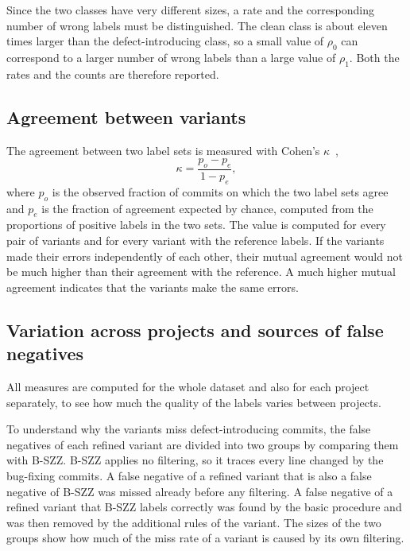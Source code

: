 \documentclass[12pt,a4paper,oneside]{report}
\newcommand{\rhoz}{\rho_0}
\newcommand{\rhoo}{\rho_1}
\begin{document}
Since the two classes have very different sizes, a rate and the corresponding
number of wrong labels must be distinguished. The clean class is about eleven
times larger than the defect-introducing class, so a small value of $\rhoz$
can correspond to a larger number of wrong labels than a large value of
$\rhoo$. Both the rates and the counts are therefore reported.

\subsection{Agreement between variants}

The agreement between two label sets is measured with Cohen's
$\kappa$~\cite{cohen1960kappa},
\begin{equation}
\kappa = \frac{p_o - p_e}{1 - p_e},
\end{equation}
where $p_o$ is the observed fraction of commits on which the two label sets
agree and $p_e$ is the fraction of agreement expected by chance, computed
from the proportions of positive labels in the two sets. The value is
computed for every pair of variants and for every variant with the reference
labels. If the variants made their errors independently of each other, their
mutual agreement would not be much higher than their agreement with the
reference. A much higher mutual agreement indicates that the variants make
the same errors.

\subsection{Variation across projects and sources of false negatives}

All measures are computed for the whole dataset and also for each project
separately, to see how much the quality of the labels varies between
projects.

To understand why the variants miss defect-introducing commits, the false
negatives of each refined variant are divided into two groups by comparing
them with B-SZZ. B-SZZ applies no filtering, so it traces every line changed
by the bug-fixing commits. A false negative of a refined variant that is also
a false negative of B-SZZ was missed already before any filtering. A false
negative of a refined variant that B-SZZ labels correctly was found by the
basic procedure and was then removed by the additional rules of the variant.
The sizes of the two groups show how much of the miss rate of a variant is
caused by its own filtering.
\end{document}
